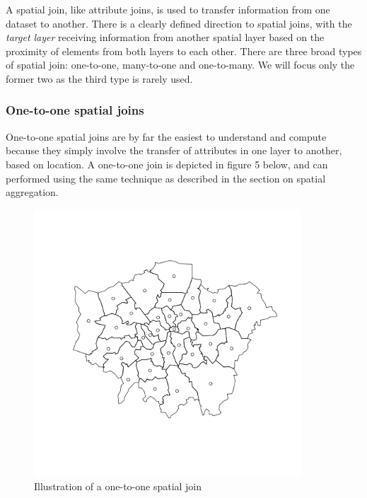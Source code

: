 \documentclass[]{article}
\let\Oldincludegraphics\includegraphics
\renewcommand{\includegraphics}[1]{\Oldincludegraphics[width=10cm]{#1}}
\begin{document}
A spatial join, like attribute joins, is used to transfer information
from one dataset to another. There is a clearly defined direction to
spatial joins, with the \emph{target layer} receiving information from
another spatial layer based on the proximity of elements from both
layers to each other. There are three broad types of spatial join:
one-to-one, many-to-one and one-to-many. We will focus only the former
two as the third type is rarely used.

\subsubsection{One-to-one spatial joins}

One-to-one spatial joins are by far the easiest to understand and
compute because they simply involve the transfer of attributes in one
layer to another, based on location. A one-to-one join is depicted in
figure 5 below, and can performed using the same technique as described
in the section on spatial aggregation.

\begin{figure}[htbp]
\centering
\includegraphics{figure/Illustration_of_a_one-to-one_spatial_join_.png}
\caption{Illustration of a one-to-one spatial join}
\end{figure}
\end{document}
